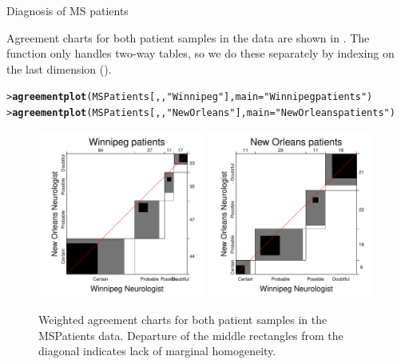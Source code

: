 \documentclass[10pt,krantz2]{krantz}\usepackage[]{graphicx}\usepackage[]{color}
\makeatletter
\newcommand{\hlstr}[1]{\textcolor[rgb]{0.192,0.494,0.8}{#1}}%
\newcommand{\hlstd}[1]{\textcolor[rgb]{0.345,0.345,0.345}{#1}}%
\newcommand{\hlkwc}[1]{\textcolor[rgb]{0.333,0.667,0.333}{#1}}%
\newcommand{\hlkwd}[1]{\textcolor[rgb]{0.737,0.353,0.396}{\textbf{#1}}}%
\newenvironment{kframe}{%
 \def\at@end@of@kframe{}%
 \ifinner\ifhmode%
  \def\at@end@of@kframe{\end{minipage}}%
  \begin{minipage}{\columnwidth}%
 \fi\fi%
 \def\FrameCommand##1{\hskip\@totalleftmargin \hskip-\fboxsep
 \colorbox{shadecolor}{##1}\hskip-\fboxsep
     \hskip-\linewidth \hskip-\@totalleftmargin \hskip\columnwidth}%
 \MakeFramed {\advance\hsize-\width
   \@totalleftmargin\z@ \linewidth\hsize
   \@setminipage}}%
 {\par\unskip\endMakeFramed%
 \at@end@of@kframe}
\newenvironment{knitrout}{}{} %
\renewenvironment{knitrout}{\small\renewcommand{\baselinestretch}{.85}}{} %
\makeatother
\begin{document}
\begin{Example}[MS2]{Diagnosis of MS patients}

Agreement charts for both patient samples in the  data
are shown in . The  function
only handles two-way tables, so we do these separately by indexing
on the last dimension ().

\begin{knitrout}
\color{fgcolor}\begin{kframe}
\begin{alltt}
\hlstd{> }\hlkwd{agreementplot}\hlstd{(MSPatients[, ,} \hlstr{"Winnipeg"}\hlstd{],} \hlkwc{main} \hlstd{=} \hlstr{"Winnipeg patients"}\hlstd{)}
\hlstd{> }\hlkwd{agreementplot}\hlstd{(MSPatients[, ,} \hlstr{"New Orleans"}\hlstd{],} \hlkwc{main} \hlstd{=} \hlstr{"New Orleans patients"}\hlstd{)}
\end{alltt}
\end{kframe}\begin{figure}[!htbp]

\centerline{\includegraphics[width=0.49\textwidth]{ch04/fig/MS-agree-1} 
\includegraphics[width=0.49\textwidth]{ch04/fig/MS-agree-2} }

\caption[Weighted agreement charts for both patient samples in the MSPatients data]{Weighted agreement charts for both patient samples in the MSPatients data. Departure of the middle rectangles from the diagonal indicates lack of marginal homogeneity.\label{fig:MS-agree}}
\end{figure}



\end{knitrout}
\end{Example}
\end{document}
